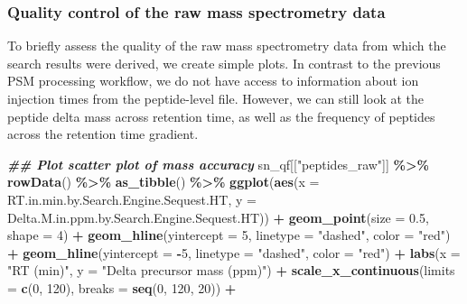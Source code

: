 \documentclass[9pt,a4paper,]{extarticle}
\newenvironment{Shaded}{\begin{snugshade}}{\end{snugshade}}
\newcommand{\AttributeTok}[1]{\textcolor[rgb]{0.13,0.29,0.53}{#1}}
\newcommand{\DecValTok}[1]{\textcolor[rgb]{0.00,0.00,0.81}{#1}}
\newcommand{\DocumentationTok}[1]{\textcolor[rgb]{0.56,0.35,0.01}{\textbf{\textit{#1}}}}
\newcommand{\FloatTok}[1]{\textcolor[rgb]{0.00,0.00,0.81}{#1}}
\newcommand{\FunctionTok}[1]{\textcolor[rgb]{0.13,0.29,0.53}{\textbf{#1}}}
\newcommand{\NormalTok}[1]{#1}
\newcommand{\SpecialCharTok}[1]{\textcolor[rgb]{0.81,0.36,0.00}{\textbf{#1}}}
\newcommand{\StringTok}[1]{\textcolor[rgb]{0.31,0.60,0.02}{#1}}
\begin{document}
\hypertarget{quality-control-of-the-raw-mass-spectrometry-data-1}{%
\subsubsection{Quality control of the raw mass spectrometry data}\label{quality-control-of-the-raw-mass-spectrometry-data-1}}

To briefly assess the quality of the raw mass spectrometry data from which the
search results were derived, we create simple plots. In contrast to the previous
PSM processing workflow, we do not have access to information about ion injection
times from the peptide-level file. However, we can still look at the peptide
delta mass across retention time, as well as the frequency of peptides across
the retention time gradient.

\begin{Shaded}
\begin{Highlighting}[]
\DocumentationTok{\#\# Plot scatter plot of mass accuracy}
\NormalTok{sn\_qf[[}\StringTok{"peptides\_raw"}\NormalTok{]] }\SpecialCharTok{\%\textgreater{}\%}
  \FunctionTok{rowData}\NormalTok{() }\SpecialCharTok{\%\textgreater{}\%}
  \FunctionTok{as\_tibble}\NormalTok{() }\SpecialCharTok{\%\textgreater{}\%}
  \FunctionTok{ggplot}\NormalTok{(}\FunctionTok{aes}\NormalTok{(}\AttributeTok{x =}\NormalTok{ RT.in.min.by.Search.Engine.Sequest.HT,}
             \AttributeTok{y =}\NormalTok{ Delta.M.in.ppm.by.Search.Engine.Sequest.HT)) }\SpecialCharTok{+}
  \FunctionTok{geom\_point}\NormalTok{(}\AttributeTok{size =} \FloatTok{0.5}\NormalTok{, }\AttributeTok{shape =} \DecValTok{4}\NormalTok{) }\SpecialCharTok{+}
  \FunctionTok{geom\_hline}\NormalTok{(}\AttributeTok{yintercept =} \DecValTok{5}\NormalTok{, }\AttributeTok{linetype =} \StringTok{"dashed"}\NormalTok{, }\AttributeTok{color =} \StringTok{"red"}\NormalTok{) }\SpecialCharTok{+}
  \FunctionTok{geom\_hline}\NormalTok{(}\AttributeTok{yintercept =} \SpecialCharTok{{-}}\DecValTok{5}\NormalTok{, }\AttributeTok{linetype =} \StringTok{"dashed"}\NormalTok{, }\AttributeTok{color =} \StringTok{"red"}\NormalTok{) }\SpecialCharTok{+}
  \FunctionTok{labs}\NormalTok{(}\AttributeTok{x =} \StringTok{"RT (min)"}\NormalTok{, }\AttributeTok{y =} \StringTok{"Delta precursor mass (ppm)"}\NormalTok{) }\SpecialCharTok{+}
  \FunctionTok{scale\_x\_continuous}\NormalTok{(}\AttributeTok{limits =} \FunctionTok{c}\NormalTok{(}\DecValTok{0}\NormalTok{, }\DecValTok{120}\NormalTok{), }\AttributeTok{breaks =} \FunctionTok{seq}\NormalTok{(}\DecValTok{0}\NormalTok{, }\DecValTok{120}\NormalTok{, }\DecValTok{20}\NormalTok{)) }\SpecialCharTok{+}

\end{Highlighting}
\end{Shaded}
\end{document}
